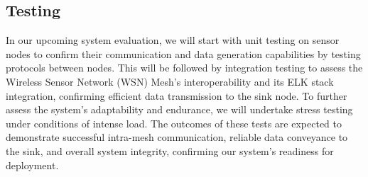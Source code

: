 



\subsection{Testing}\label{testing}


In our upcoming system evaluation, we will start with unit testing on sensor nodes to confirm their communication and data generation capabilities by testing protocols between nodes. This will be followed by integration testing to assess the Wireless Sensor Network (WSN) Mesh's interoperability and its ELK stack integration, confirming efficient data transmission to the sink node. To further assess the system's adaptability and endurance, we will undertake stress testing under conditions of intense load. The outcomes of these tests are expected to demonstrate successful intra-mesh communication, reliable data conveyance to the sink, and overall system integrity, confirming our system's readiness for deployment.

